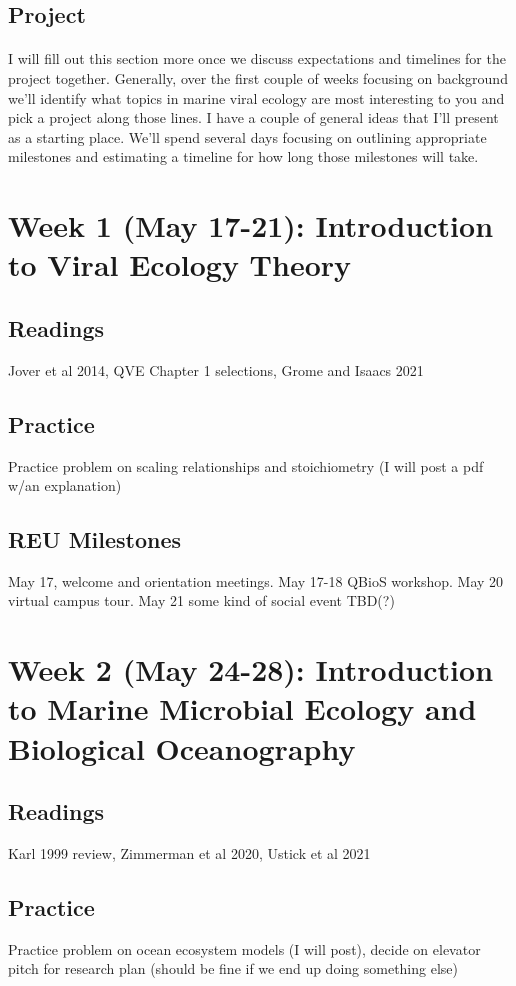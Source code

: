 \documentclass[11pt]{amsart}
\begin{document}
\subsection{Project} 
\paragraph{} I will fill out this section more once we discuss expectations and timelines for the project together. Generally, over the first couple of weeks focusing on background we'll identify what topics in marine viral ecology are most interesting to you and pick a project along those lines. I have a couple of general ideas that I'll present as a starting place. We'll spend several days focusing on outlining appropriate milestones and estimating a timeline for how long those milestones will take. 
\section{Week 1 (May 17-21): Introduction to Viral Ecology Theory}
\subsection{Readings} Jover et al 2014, QVE Chapter 1 selections, Grome and Isaacs 2021
\subsection{Practice} Practice problem on scaling relationships and stoichiometry (I will post a pdf w/an explanation)
\subsection{REU Milestones} May 17, welcome and orientation meetings. May 17-18 QBioS workshop. May 20 virtual campus tour. May 21 some kind of social event TBD(?)
\section{Week 2 (May 24-28): Introduction to Marine Microbial Ecology and Biological Oceanography}
\subsection{Readings} Karl 1999 review, Zimmerman et al 2020, Ustick et al 2021
\subsection{Practice} Practice problem on ocean ecosystem models (I will post), decide on elevator pitch for research plan (should be fine if we end up doing something else)
\end{document}
